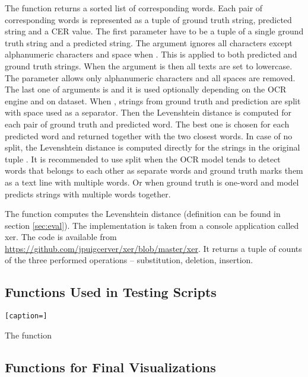 The function  returns a sorted list of corresponding words. Each pair of corresponding words is represented as a tuple of ground truth string, predicted string and a CER value. The first parameter have to be a tuple of a single ground truth string and a predicted string. The argument  ignores all characters except alphanumeric characters and space when . This is applied to both predicted and ground truth strings. When the argument  is  then all texts are set to lowercase. The  parameter allows only alphanumeric characters and all spaces are removed. The last one of arguments is  and it is used optionally depending on the OCR engine and on dataset. When , strings from ground truth and prediction are split with space used as a separator. Then the Levenshtein distance is computed for each pair of ground truth and predicted word. The best one is chosen for each predicted word and returned together with the two closest words. In case of no split, the Levenshtein distance is computed directly for the strings in the original tuple . It is recommended to use split when the OCR model tends to detect words that belongs to each other as separate words and ground truth marks them as a text line with multiple words. Or when ground truth is one-word and model predicts strings with multiple words together.

The function  computes the Levenshtein distance (definition can be found in section \ref*{sec:eval}). The implementation is taken from a console application called xer. The code is available from \url{https://github.com/jpuigcerver/xer/blob/master/xer}. It returns a tuple of counts of the three performed operations --  substitution, deletion, insertion.

\subsection*{Functions Used in Testing Scripts}

\begin{lstlisting}[caption=]

\end{lstlisting}

The function \tn{}


\subsection*{Functions for Final Visualizations}

